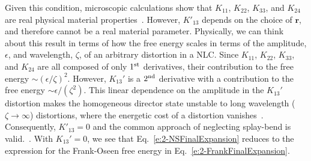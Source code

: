 
Given this condition, microscopic calculations show that $K_{11}$, $K_{22}$, $K_{33}$, and $K_{24}$ are real physical material properties~\cite{RN55,RN56,RN225,RN224,RN217,RN222}.
However, $K'_{13}$ depends on the choice of $\mathbf{r}$, and therefore cannot be a real material parameter.
Physically, we can think about this result in terms of how the free energy scales in terms of the amplitude, $\epsilon$, and wavelength, $\zeta$, of an arbitrary distortion in a NLC.
Since $K_{11}$, $K_{22}$, $K_{33}$, and $K_{24}$ are all composed of only $1^{\rm st}$ derivatives, their contribution to the free energy $\sim (\epsilon/\zeta)^2$.
However, $K_{13}'$ is a $2^{\rm nd}$ derivative with a contribution to the free energy $\sim \epsilon/(\zeta^2)$.
This linear dependence on the amplitude in the $K_{13}'$ distortion makes the homogeneous director state unstable to long wavelength ($\zeta \rightarrow \infty$) distortions, where the energetic cost of a distortion vanishes~\cite{RN55}.
Consequently, $K'_{13} = 0$ and the common approach of neglecting splay-bend is valid.~\cite{RN55,RN225}.
With $K_{13}'=0$, we see that Eq.~\ref{e:2-NSFinalExpansion} reduces to the expression for the Frank-Oseen free energy in Eq.~\ref{e:2-FrankFinalExpansion}.

